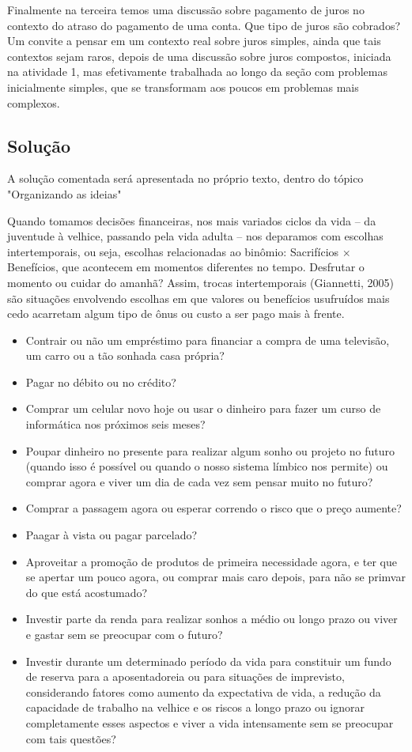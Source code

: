 \begin{texto}
{Finalmente na terceira temos uma discussão sobre pagamento de juros no contexto do atraso do pagamento de uma conta. Que tipo de juros são cobrados? Um convite a pensar em um contexto real sobre juros simples, ainda que tais contextos sejam raros, depois de uma discussão sobre juros compostos, iniciada na atividade 1, mas efetivamente trabalhada ao longo da seção com problemas inicialmente simples, que se transformam aos poucos em problemas mais complexos.

\subsection{Solução}
A solução comentada será apresentada no próprio texto, dentro do tópico "Organizando as ideias"
}
\end{texto}

Quando tomamos decisões financeiras, nos mais variados ciclos da vida – da juventude à velhice, passando pela vida adulta – nos deparamos com escolhas intertemporais, ou seja, escolhas relacionadas ao binômio: Sacrifícios $\times$ Benefícios, que acontecem em momentos diferentes no tempo. Desfrutar o momento ou cuidar do amanhã? Assim, trocas intertemporais (Giannetti, 2005) são situações envolvendo escolhas em que valores ou benefícios usufruídos mais cedo acarretam algum tipo de ônus ou custo a ser pago mais à frente.

\begin{itemize}
  \item Contrair ou não um empréstimo para financiar a compra de uma televisão, um carro ou a tão sonhada casa própria?
  \item Pagar no débito ou no crédito?
  \item Comprar um celular novo hoje ou usar o dinheiro para fazer um curso de informática nos próximos seis meses?
  \item Poupar dinheiro no presente para realizar algum sonho ou projeto no futuro (quando isso é possível ou quando o nosso sistema límbico nos permite) ou comprar agora e viver um dia de cada vez sem pensar muito no futuro?
  \item Comprar a passagem agora ou esperar correndo o risco que o preço aumente?
  \item Paagar à vista ou pagar parcelado?
  \item Aproveitar a promoção de produtos de primeira necessidade agora, e ter que se apertar um pouco agora, ou comprar mais caro depois, para não se primvar do que está acostumado?
  \item Investir parte da renda para realizar sonhos a médio ou longo prazo ou viver e gastar sem se preocupar com o futuro?
  \item Investir durante um determinado período da vida para constituir um fundo de reserva para a aposentadoreia ou para situações de imprevisto, considerando fatores como aumento da expectativa de vida, a redução da capacidade de trabalho na velhice e os riscos a longo prazo ou ignorar completamente esses aspectos e viver a vida intensamente sem se preocupar com tais questões?
\end{itemize}

